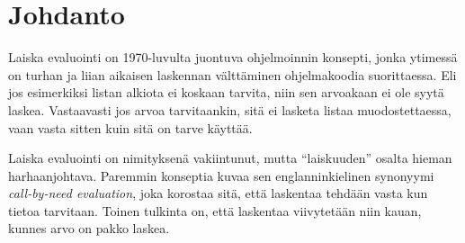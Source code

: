 
\section{Johdanto}




Laiska evaluointi on 1970-luvulta juontuva ohjelmoinnin konsepti, jonka ytimessä on turhan ja liian aikaisen laskennan välttäminen ohjelmakoodia suorittaessa. Eli jos esimerkiksi listan alkiota ei koskaan tarvita, niin sen arvoakaan ei ole syytä laskea. Vastaavasti jos arvoa tarvitaankin, sitä ei lasketa listaa muodostettaessa, vaan vasta sitten kuin sitä on tarve käyttää.

Laiska evaluointi on nimityksenä vakiintunut, mutta ``laiskuuden'' osalta hieman harhaanjohtava. Paremmin konseptia kuvaa sen englanninkielinen synonyymi \textit{call-by-need evaluation}, joka korostaa sitä, että laskentaa tehdään vasta kun tietoa tarvitaan. Toinen tulkinta on, että laskentaa viivytetään niin kauan, kunnes arvo on pakko laskea.

